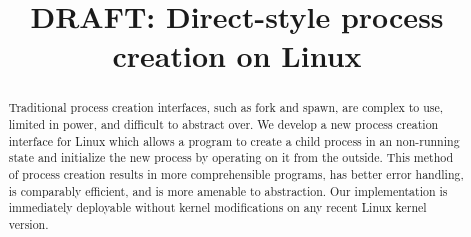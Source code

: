 \documentclass[letterpaper,twocolumn,10pt]{article}
\begin{document}
\newcommand{\twosigma}{[tech company]} 
\date{}
\title{\Large \bf DRAFT: Direct-style process creation on Linux}
\maketitle
\begin{abstract}
Traditional process creation interfaces,
such as fork and spawn,
are complex to use, limited in power, and difficult to abstract over.
We develop a new process creation interface for Linux
which allows a program to create a child process in an non-running state
and initialize the new process by operating on it from the outside.
This method of process creation results in more comprehensible programs, 
has better error handling,
is comparably efficient,
and is more amenable to abstraction.
Our implementation is immediately deployable without kernel modifications on any recent Linux kernel version.
\end{abstract}
\end{document}
